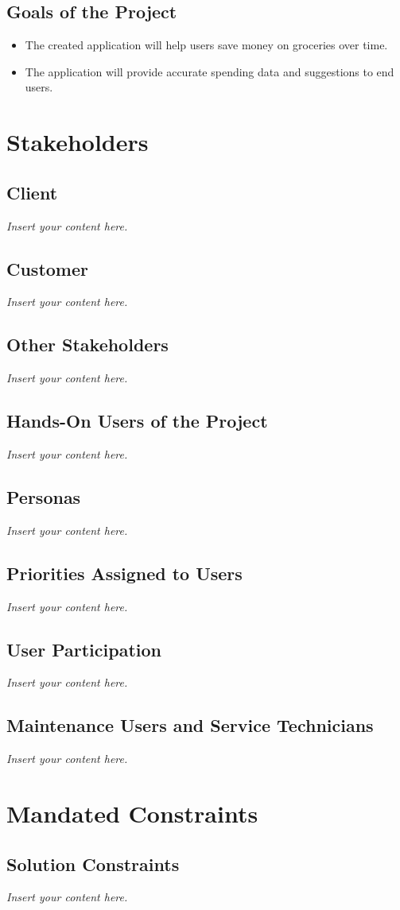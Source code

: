 \documentclass[12pt]{article}
\newcommand{\lips}{\textit{Insert your content here.}}
\begin{document}
\subsection{Goals of the Project}
\begin{itemize}
  \item The created application will help users save money on groceries over time.
  \item The application will provide accurate spending data and suggestions to end users.
\end{itemize}  
\section{Stakeholders}
\subsection{Client}
\lips
\subsection{Customer}
\lips
\subsection{Other Stakeholders}
\lips
\subsection{Hands-On Users of the Project}
\lips
\subsection{Personas}
\lips
\subsection{Priorities Assigned to Users}
\lips
\subsection{User Participation}
\lips
\subsection{Maintenance Users and Service Technicians}
\lips

\section{Mandated Constraints}
\subsection{Solution Constraints}
\lips
\end{document}
